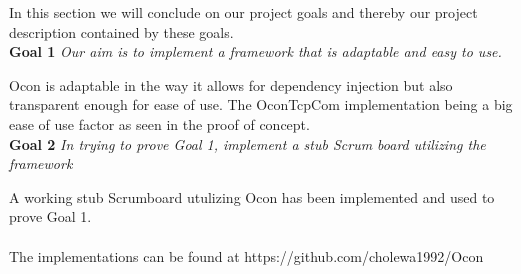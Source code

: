 \documentclass[../report.tex]{subfiles}
\begin{document}
\graphicspath{{img/}{../img/}}


In this section we will conclude on our project goals and thereby our project description contained by these goals.\\

\textbf{Goal 1} \textit{Our aim is to implement a framework that is adaptable and easy to use.}

Ocon is adaptable in the way it allows for dependency injection but also transparent enough for ease of use. The OconTcpCom implementation being a big ease of use factor as seen in the proof of concept. \\
 
\textbf{Goal 2} \textit{In trying to prove Goal 1, implement a stub Scrum board utilizing the framework}

A working stub Scrumboard utulizing Ocon has been implemented and used to prove Goal 1. \\ \\
 
The implementations can be found at https://github.com/cholewa1992/Ocon
\end{document}

